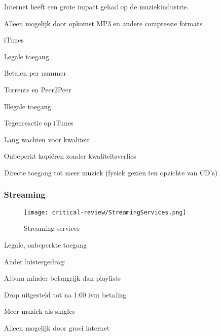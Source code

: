 Internet heeft een grote impact gehad op de muziekindustrie. 

\begin{todolist}
    \item Alleen mogelijk door opkomst MP3 en andere compressie formats
    \item iTunes \begin{todolist}
        \item Legale toegang
        \item Betalen per nummer
    \end{todolist}
    \item Torrents en Peer2Peer \begin{todolist}
        \item Illegale toegang
        \item Tegenreactie op iTunes
        \item Lang wachten voor kwaliteit
    \end{todolist}
    \item Onbeperkt kopiëren zonder kwaliteitsverlies
    \item Directe toegang tot meer muziek (fysiek gezien ten opzichte van CD's)
\end{todolist}

\subsubsection*{Streaming}
\begin{wrapfigure}{r}{0.25\textwidth}
    \centering
    \texttt{[image: critical-review/StreamingServices.png]}
    \caption{Streaming services}
    \label{fig:critical-review:StreamingServices}
\end{wrapfigure}


\begin{todolist}
    \item Legale, onbeperkte toegang
    \item Ander luistergedrag: \begin{todolist}
        \item Album minder belangrijk dan playlists
        \item Drop uitgesteld tot na 1:00 ivm betaling
    \end{todolist}
    \item Meer muziek als singles
    \item Alleen mogelijk door groei internet
\end{todolist}

